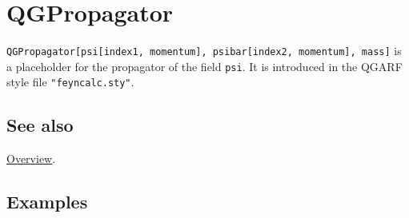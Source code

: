 \documentclass[../FeynHelpersManual.tex]{subfiles}
\begin{document}
\hypertarget{qgpropagator}{
\section{QGPropagator}\label{qgpropagator}}

\texttt{QGPropagator[\allowbreak{}psi[\allowbreak{}index1,\ \allowbreak{}momentum],\ \allowbreak{}psibar[\allowbreak{}index2,\ \allowbreak{}momentum],\ \allowbreak{}mass]}
is a placeholder for the propagator of the field \texttt{psi}. It is
introduced in the QGARF style file \texttt{"feyncalc.sty"}.

\subsection{See also}

\hyperlink{toc}{Overview}.

\subsection{Examples}
\end{document}
